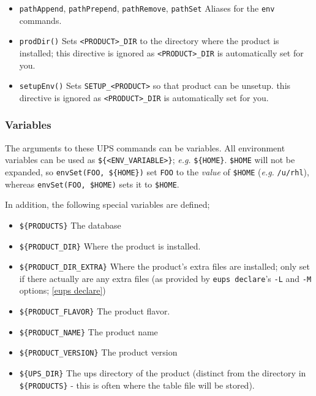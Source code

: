 \documentclass{article}
\newcommand{\code}[1]{\texttt{#1}}
\begin{document}
\begin{itemize}
   \item \code{pathAppend}, \code{pathPrepend}, \code{pathRemove}, \code{pathSet}
     Aliases for the \code{env} commands.

   \item \code{prodDir()}
     Sets \code{<PRODUCT>\_DIR} to the directory where the product is installed;
     this directive is ignored as \code{<PRODUCT>\_DIR} is automatically set for you.

   \item \code{setupEnv()}
     Sets \code{SETUP\_<PRODUCT>} so that product can be unsetup.
     this directive is ignored as \code{<PRODUCT>\_DIR} is automatically set for you.
\end{itemize}

\subsubsection{Variables}

The arguments to these UPS commands can be variables. All environment
variables can be used as \code{\$\{<ENV\_VARIABLE>\}}; \textit{e.g.} \code{\$\{HOME\}}.
\code{\$HOME} will not be expanded, so \code{envSet(FOO, \$\{HOME\})}
set \code{FOO} to the \textit{value} of \code{\$HOME} (\textit{e.g.} \code{/u/rhl}), whereas
\code{envSet(FOO, \$HOME)} sets it to \code{\$HOME}.

In addition, the following special variables are defined;

\begin{itemize}
  \item \code{\$\{PRODUCTS\}}
    The database

  \item \code{\$\{PRODUCT\_DIR\}}
    Where the product is installed.

  \item \code{\$\{PRODUCT\_DIR\_EXTRA\}}
    Where the product's extra files are installed; only set if there actually are
    any extra files (as provided by \code{eups declare}'s \code{-L} and \code{-M} options;
    \ref{eups declare})

  \item \code{\$\{PRODUCT\_FLAVOR\}}
    The product flavor.

  \item \code{\$\{PRODUCT\_NAME\}}
    The product name

  \item \code{\$\{PRODUCT\_VERSION\}}
    The product version

  \item \code{\$\{UPS\_DIR\}}
    The ups directory of the product (distinct from the directory
    in \code{\$\{PRODUCTS\}} - this is often where the table file will be stored).
\end{itemize}
\end{document}
